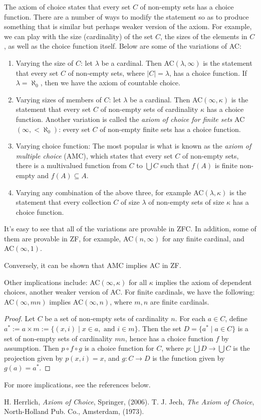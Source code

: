 \documentclass[12pt]{article}
\begin{document}
The axiom of choice states that every set $C$ of non-empty sets has a choice function.  There are a number of ways to modify the statement so as to produce something that is similar but perhaps weaker version of the axiom.  For example, we can play with the size (cardinality) of the set $C$, the sizes of the elements in $C$, as well as the choice function itself.  Below are some of the variations of AC:

\begin{enumerate}
\item Varying the size of $C$: let $\lambda$ be a cardinal.  Then AC$(\lambda,\infty)$ is the statement that every set $C$ of non-empty sets, where $|C|=\lambda$, has a choice function.  If $\lambda = \aleph_0$, then we have the axiom of countable choice.
\item Varying sizes of members of $C$: let $\lambda$ be a cardinal.  Then AC$(\infty,\kappa)$ is the statement that every set $C$ of non-empty sets of cardinality $\kappa$ has a choice function.  Another variation is called the \emph{axiom of choice for finite sets} AC$(\infty,<\! \aleph_0)$: every set $C$ of non-empty finite sets has a choice function.
\item Varying choice function: The most popular is what is known as the \emph{axiom of multiple choice} (AMC), which states that every set $C$ of non-empty sets, there is a multivalued function from $C$ to $\bigcup C$ such that $f(A)$ is finite non-empty and $f(A)\subseteq A$.
\item Varying any combination of the above three, for example AC$(\lambda,\kappa)$ is the statement that every collection $C$ of size $\lambda$ of non-empty sets of size $\kappa$ has a choice function.
\end{enumerate}

It's easy to see that all of the variations are provable in ZFC.  In addition, some of them are provable in ZF, for example, AC$(n,\infty)$ for any finite cardinal, and AC$(\infty,1)$.

Conversely, it can be shown that AMC implies AC in ZF.

Other implications include: AC$(\infty,\kappa)$ for all $\kappa$ implies the axiom of dependent choices, another weaker version of AC.  For finite cardinals, we have the following: AC$(\infty,mn)$ implies AC$(\infty,n)$, where $m,n$ are finite cardinals.
\begin{proof}  Let $C$ be a set of non-empty sets of cardinality $n$.  For each $a\in C$, define $a^*:=a\times m:=\lbrace (x,i)\mid x\in a,\mbox{ and } i\in m\rbrace$.  Then the set $D=\lbrace a^*\mid a\in C\rbrace$ is a set of non-empty sets of cardinality $mn$, hence has a choice function $f$ by assumption.  Then $p\circ f\circ g$ is a choice function for $C$, where $p:\bigcup D\to \bigcup C$ is the projection given by $p(x,i)=x$, and $g:C\to D$ is the function given by $g(a)=a^*$.
\end{proof}

For more implications, see the references below.

\begin{thebibliography}{8}
 H. Herrlich, \emph{Axiom of Choice}, Springer, (2006).
 T. J. Jech, \emph{The Axiom of Choice}, North-Holland Pub. Co., Amsterdam, (1973).
\end{thebibliography}
\end{document}
